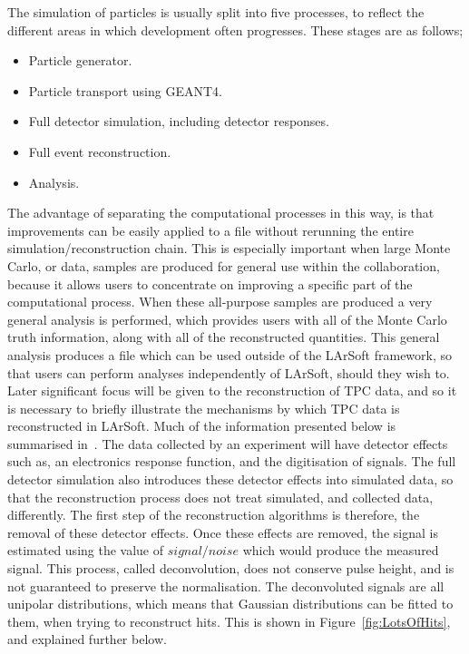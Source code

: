 The simulation of particles is usually split into five processes, to reflect the different areas in which development often progresses. These stages are as follows;
\begin{itemize}
\item Particle generator.
\item Particle transport using GEANT4.
\item Full detector simulation, including detector responses. 
\item Full event reconstruction.
\item Analysis.
\end{itemize}
The advantage of separating the computational processes in this way, is that improvements can be easily applied to a file without rerunning the entire simulation/reconstruction chain. This is especially important when large Monte Carlo, or data, samples are produced for general use within the collaboration, because it allows users to concentrate on improving a specific part of the computational process. When these all-purpose samples are produced a very general analysis is performed, which provides users with all of the Monte Carlo truth information, along with all of the reconstructed quantities. This general analysis produces a file which can be used outside of the LArSoft framework, so that users can perform analyses independently of LArSoft, should they wish to. \\

Later significant focus will be given to the reconstruction of TPC data, and so it is necessary to briefly illustrate the mechanisms by which TPC data is reconstructed in LArSoft. Much of the information presented below is summarised in~\citep{LArSoftOrg, LArSoftRecoNote}. The data collected by an experiment will have detector effects such as, an electronics response function, and the digitisation of signals. The full detector simulation also introduces these detector effects into simulated data, so that the reconstruction process does not treat simulated, and collected data, differently. The first step of the reconstruction algorithms is therefore, the removal of these detector effects. Once these effects are removed, the signal is estimated using the value of $signal/noise$ which would produce the measured signal. This process, called deconvolution, does not conserve pulse height, and is not guaranteed to preserve the normalisation. The deconvoluted signals are all unipolar distributions, which means that Gaussian distributions can be fitted to them, when trying to reconstruct hits. This is shown in Figure~\ref{fig:LotsOfHits}, and explained further below.\\

